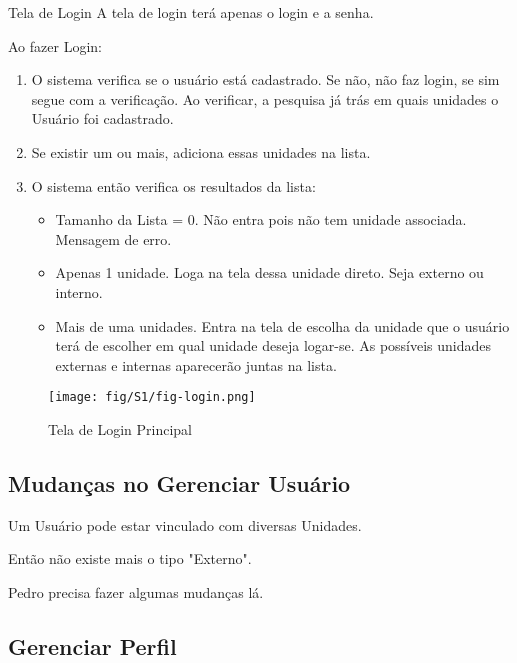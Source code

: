 	
	\begin{imagine}{Tela de Login}
		A tela de login terá apenas o login e a senha.
		
		Ao fazer Login:

		\begin{enumerate}

		
		\item O sistema verifica se o usuário está cadastrado. Se não, não faz login, se sim segue com a verificação. Ao verificar, a pesquisa já trás em quais unidades o Usuário foi cadastrado.
		
		\item  Se existir um ou mais, adiciona essas unidades na lista.
		
		\item O sistema então verifica os resultados da lista:
		
		\begin{itemize}
			\item Tamanho da Lista = 0. Não entra pois não tem unidade associada. Mensagem de erro.
			
			\item Apenas 1 unidade. Loga na tela dessa unidade direto. Seja externo ou interno.
			
			\item Mais de uma unidades. Entra na tela de escolha da unidade que o usuário terá de escolher em qual unidade deseja logar-se. As possíveis unidades externas e internas aparecerão juntas na lista.
		\end{itemize}	

		\end{enumerate}
	\end{imagine} 

	
    \begin{figure}[htbp!]
		\centering
		\texttt{[image: fig/S1/fig-login.png]}
		\caption{Tela de Login Principal}
	\label{fig:login}
	\end{figure}


	\subsection{Mudanças no Gerenciar Usuário}	
	
	Um Usuário pode estar vinculado com diversas Unidades.
	
	Então não existe mais o tipo "Externo".
	
	Pedro precisa fazer algumas mudanças lá.


	\subsection{Gerenciar Perfil}	
	
